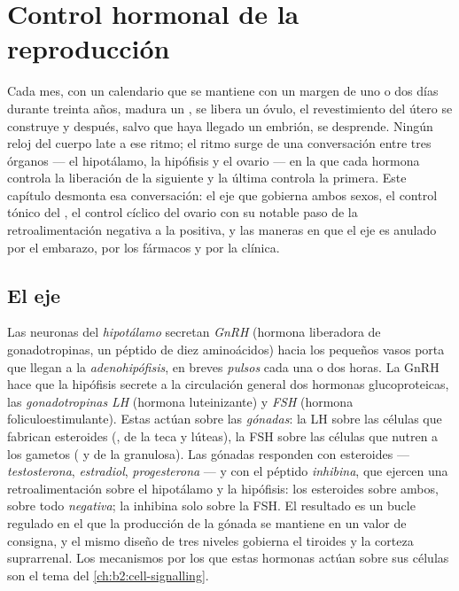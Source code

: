 \chapter{Control hormonal de la reproducción}\label{ch:b2:reproductive-hormones}

Cada mes, con un calendario que se mantiene con un margen de uno o dos
días durante treinta años, madura un , se libera un óvulo, el
revestimiento del útero se construye y después, salvo que haya llegado un
embrión, se desprende. Ningún reloj del cuerpo late a ese ritmo; el ritmo
surge de una conversación entre tres órganos --- el hipotálamo, la
hipófisis y el ovario --- en la que cada hormona controla la liberación de
la siguiente y la última controla la primera. Este capítulo desmonta esa
conversación: el eje que gobierna ambos sexos, el control tónico del
, el control cíclico del ovario con su notable paso de la
retroalimentación negativa a la positiva, y las maneras en que el eje es
anulado por el embarazo, por los fármacos y por la clínica.

\section{El eje}

\begin{definition}\label{def:b2:reproductive-hormones:axis}
Las neuronas del \emph{hipotálamo} secretan \emph{GnRH} (hormona
liberadora de gonadotropinas, un péptido de diez aminoácidos) hacia los
pequeños vasos porta que llegan a la \emph{adenohipófisis}, en breves
\emph{pulsos} cada una o dos horas. La GnRH hace que la hipófisis secrete
a la circulación general dos hormonas glucoproteicas, las
\emph{gonadotropinas} \emph{LH} (hormona luteinizante) y \emph{FSH}
(hormona foliculoestimulante). Estas actúan sobre las \emph{gónadas}: la
LH sobre las células que fabrican esteroides (, de la
teca y lúteas), la FSH sobre las células que nutren a los gametos
( y de la granulosa). Las gónadas responden con
esteroides --- \emph{testosterona}, \emph{estradiol},
\emph{progesterona} --- y con el péptido \emph{inhibina}, que ejercen una
retroalimentación sobre el hipotálamo y la hipófisis: los esteroides
sobre ambos, sobre todo \emph{negativa}; la inhibina solo sobre la FSH.
El resultado es un bucle regulado en el que la producción de la gónada
se mantiene en un valor de consigna, y el mismo diseño de tres niveles
gobierna el tiroides y la corteza suprarrenal. Los mecanismos por los que
estas hormonas actúan sobre sus células son el tema del
\cref{ch:b2:cell-signalling}.
\end{definition}

